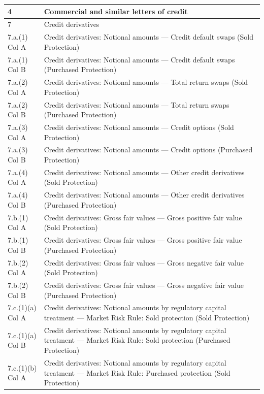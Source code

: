 \documentclass[conference]{IEEEtran}
\begin{document}
\begin{table}[htbp]
\begin{tabular}{|p{3cm}|p{12cm}|}
		\hline
		4 & Commercial and similar letters of credit \\
		\hline
		7 & Credit derivatives \\
		\hline
		7.a.(1) Col A & Credit derivatives: Notional amounts --- Credit default swaps (Sold Protection) \\
		\hline
		7.a.(1) Col B & Credit derivatives: Notional amounts --- Credit default swaps (Purchased Protection) \\
		\hline
		7.a.(2) Col A & Credit derivatives: Notional amounts --- Total return swaps (Sold Protection) \\
		\hline
		7.a.(2) Col B & Credit derivatives: Notional amounts --- Total return swaps (Purchased Protection) \\
		\hline
		7.a.(3) Col A & Credit derivatives: Notional amounts --- Credit options (Sold Protection) \\
		\hline
		7.a.(3) Col B & Credit derivatives: Notional amounts --- Credit options (Purchased Protection) \\
		\hline
		7.a.(4) Col A & Credit derivatives: Notional amounts --- Other credit derivatives (Sold Protection) \\
		\hline
		7.a.(4) Col B & Credit derivatives: Notional amounts --- Other credit derivatives (Purchased Protection) \\
		\hline
		7.b.(1) Col A & Credit derivatives: Gross fair values --- Gross positive fair value (Sold Protection) \\
		\hline
		7.b.(1) Col B & Credit derivatives: Gross fair values --- Gross positive fair value (Purchased Protection) \\
		\hline
		7.b.(2) Col A & Credit derivatives: Gross fair values --- Gross negative fair value (Sold Protection) \\
		\hline
		7.b.(2) Col B & Credit derivatives: Gross fair values --- Gross negative fair value (Purchased Protection) \\
		\hline
		7.c.(1)(a) Col A & Credit derivatives: Notional amounts by regulatory capital treatment --- Market Risk Rule: Sold protection (Sold Protection) \\
		\hline
		7.c.(1)(a) Col B & Credit derivatives: Notional amounts by regulatory capital treatment --- Market Risk Rule: Sold protection (Purchased Protection) \\
		\hline
		7.c.(1)(b) Col A & Credit derivatives: Notional amounts by regulatory capital treatment --- Market Risk Rule: Purchased protection (Sold Protection) \\

\end{tabular}
\end{table}
\end{document}
